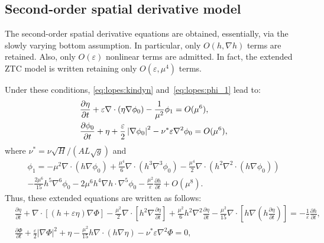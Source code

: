 \subsection{Second-order spatial derivative model}
The second-order spatial derivative equations are obtained,
essentially, via the slowly varying bottom assumption. In particular,
only $O(h,\nabla h)$ terms are retained.  Also, only $O(\varepsilon)$
nonlinear terms are admitted.  In fact, the extended ZTC model is
written retaining only $O(\varepsilon,\mu^4)$ terms.

Under these conditions, \eqref{eq:lopes:kindyn} and~\eqref{eq:lopes:phi_1}
lead to:
\begin{subequations}
\label{eq:lopes:kindyn2}
\begin{align} &\displaystyle\frac{\partial \eta}{\partial
    t}+\varepsilon\nabla\cdot(\eta\nabla\phi_0)
  -\frac{1}{\mu^2}\phi_1=O(\mu^{6}),
  \vspace{0.3cm}
  \label{eq:lopes:kindyn2-a}
  \\ &\displaystyle\frac{\partial \phi_0}{\partial t}+\eta +
  \frac{\varepsilon}{2}
  \left|\nabla\phi_0\right|^2-\nu^*\varepsilon\nabla^2\phi_0
  =O(\mu^{6}),
  \label{eq:lopes:kindyn2-b}
\end{align}
\end{subequations}
where $\nu^*=\nu\sqrt{H}/(AL\sqrt{g})$ and
\begin{multline}
\label{eq:lopes:phi_2}
\phi_1= -\mu^{2}\nabla\cdot\left(h\nabla\phi_0\right)
+\frac{\mu^{4}}{6}\nabla\cdot\left(h^3\nabla^3\phi_0\right)
-\frac{\mu^{4}}{2}\nabla\cdot\left(h^2
\nabla^2\cdot\left(h\nabla\phi_0\right)
\right)\\
-\frac{2\mu^6}{15}h^5\nabla^6\phi_0-2\mu^6h^4\nabla
h\cdot\nabla^5\phi_0
-\frac{\mu^2}{\varepsilon}\frac{\partial h}{\partial t}+O(\mu^{8}).
\end{multline}
Thus, these extended equations are written as follows:
\begin{subequations}
\label{eq:lopes:ztcdimensionless}
\begin{align}
  &\frac{\partial\eta}{\partial t}
  +\nabla\cdot[(h+\varepsilon\eta)\nabla{\Phi}] -\frac{\mu^2}{2}
  \nabla\cdot [h^{2}\nabla\frac{\partial \eta} {\partial t}]
  +\frac{\mu^2}{6}h^{2}\nabla^2\frac{\partial\eta}{\partial t}
  -\frac{\mu^2}{15}\nabla\cdot[h\nabla(h\frac{\partial\eta}
  {\partial t})]=-\frac{1} {\varepsilon}\frac{\partial h}{\partial
    t}, \label{eq:lopes:ztcdimensionless-a}\\ &\frac{\partial
    \Phi}{\partial t} +\frac{\varepsilon}{2}|\nabla\Phi|^2+\eta-
  \frac{\mu^2}{15}h\nabla\cdot(h\nabla\eta)-\nu^*\varepsilon
  \nabla^2\Phi = 0,
  \label{eq:lopes:ztcdimensionless-b}
\end{align}
\end{subequations}
